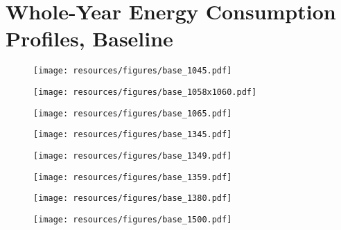 \newpage
\section{Whole-Year Energy Consumption Profiles, Baseline}

\renewcommand\thefigure{\Alph{section}.\arabic{figure}}
\setcounter{figure}{0}
\begin{figure}[h]
\centering
\begin{minipage}{0.49\textwidth}
  \centering
  \texttt{[image: resources/figures/base\_1045.pdf]}
  \label{fig:appendix_base_1045}
\end{minipage}
\begin{minipage}{0.49\textwidth}
  \centering
  \texttt{[image: resources/figures/base\_1058x1060.pdf]}
  \label{fig:appendix_base_1058x1060}
\end{minipage}
\end{figure}
\begin{figure}[h]
\centering
\begin{minipage}{0.49\textwidth}
  \centering
  \texttt{[image: resources/figures/base\_1065.pdf]}
  \label{fig:appendix_base_1065}
\end{minipage}
\begin{minipage}{0.49\textwidth}
  \centering
  \texttt{[image: resources/figures/base\_1345.pdf]}
  \label{fig:appendix_base_1345}
\end{minipage}
\end{figure}
\begin{figure}[h]
\centering
\begin{minipage}{0.49\textwidth}
  \centering
  \texttt{[image: resources/figures/base\_1349.pdf]}
  \label{fig:appendix_base_1349}
\end{minipage}
\begin{minipage}{0.49\textwidth}
  \centering
  \texttt{[image: resources/figures/base\_1359.pdf]}
  \label{fig:appendix_base_1359}
\end{minipage}
\end{figure}
\begin{figure}[h]
\centering
\begin{minipage}{0.49\textwidth}
  \centering
  \texttt{[image: resources/figures/base\_1380.pdf]}
  \label{fig:appendix_base_1380}
\end{minipage}
\begin{minipage}{0.49\textwidth}
  \centering
  \texttt{[image: resources/figures/base\_1500.pdf]}
  \label{fig:appendix_base_1500}
\end{minipage}
\end{figure}
